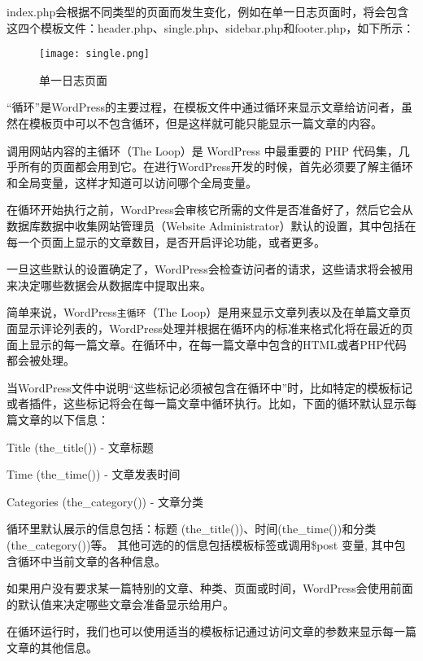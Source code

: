 index.php会根据不同类型的页面而发生变化，例如在单一日志页面时，将会包含这四个模板文件：header.php、single.php、sidebar.php和footer.php，如下所示：


\begin{figure}[!ht]
\centering
\texttt{[image: single.png]}
\caption{单一日志页面}
\end{figure}

“循环”\cite{the_loop}是WordPress的主要过程，在模板文件中通过循环来显示文章给访问者，虽然在模板页中可以不包含循环，但是这样就可能只能显示一篇文章的内容。

调用网站内容的主循环（The Loop）是 WordPress 中最重要的 PHP 代码集，几乎所有的页面都会用到它。在进行WordPress开发的时候，首先必须要了解主循环和全局变量，这样才知道可以访问哪个全局变量。

在循环开始执行之前，WordPress会审核它所需的文件是否准备好了，然后它会从数据库数据中收集网站管理员（Website Administrator）默认的设置，其中包括在每一个页面上显示的文章数目，是否开启评论功能，或者更多。

一旦这些默认的设置确定了，WordPress会检查访问者的请求，这些请求将会被用来决定哪些数据会从数据库中提取出来。


简单来说，WordPress\texttt{主循环}（The Loop）是用来显示文章列表以及在单篇文章页面显示评论列表的，WordPress处理并根据在循环内的标准来格式化将在最近的页面上显示的每一篇文章。在循环中，在每一篇文章中包含的HTML或者PHP代码都会被处理。


当WordPress文件中说明“这些标记必须被包含在循环中”时，比如特定的模板标记或者插件，这些标记将会在每一篇文章中循环执行。比如，下面的循环默认显示每篇文章的以下信息：

\begin{compactitem}
\item Title (the\_title()) - 文章标题
\item Time (the\_time()) - 文章发表时间
\item Categories (the\_category()) - 文章分类
\end{compactitem}

循环里默认展示的信息包括：标题 (the\_title())、时间(the\_time())和分类 (the\_category())等。 其他可选的的信息包括模板标签或调用\$post 变量, 其中包含循环中当前文章的各种信息。



如果用户没有要求某一篇特别的文章、种类、页面或时间，WordPress会使用前面的默认值来决定哪些文章会准备显示给用户。

在循环运行时，我们也可以使用适当的模板标记通过访问文章的参数来显示每一篇文章的其他信息。

